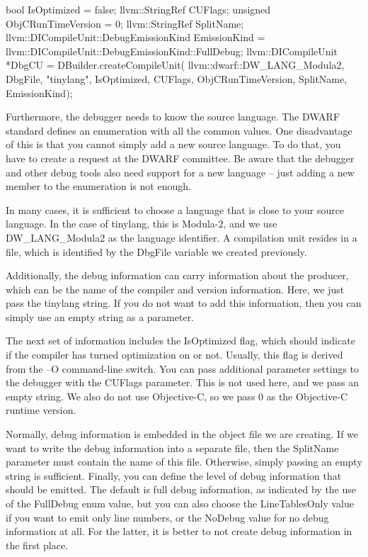 \begin{cpp}
bool IsOptimized = false;
llvm::StringRef CUFlags;
unsigned ObjCRunTimeVersion = 0;
llvm::StringRef SplitName;
llvm::DICompileUnit::DebugEmissionKind EmissionKind =
    llvm::DICompileUnit::DebugEmissionKind::FullDebug;
llvm::DICompileUnit *DbgCU = DBuilder.createCompileUnit(
    llvm::dwarf::DW_LANG_Modula2, DbgFile, "tinylang",
    IsOptimized, CUFlags, ObjCRunTimeVersion, SplitName,
    EmissionKind);
\end{cpp}

Furthermore, the debugger needs to know the source language. The DWARF standard defines an enumeration with all the common values. One disadvantage of this is that you cannot simply add a new source language. To do that, you have to create a request at the DWARF committee. Be aware that the debugger and other debug tools also need support for a new language – just adding a new member to the enumeration is not enough.

In many cases, it is sufficient to choose a language that is close to your source language. In the case of tinylang, this is Modula-2, and we use DW\_LANG\_Modula2 as the language identifier. A compilation unit resides in a file, which is identified by the DbgFile variable we created previously.

Additionally, the debug information can carry information about the producer, which can be the name of the compiler and version information. Here, we just pass the tinylang string. If you do not want to add this information, then you can simply use an empty string as a parameter.

The next set of information includes the IsOptimized flag, which should indicate if the compiler has turned optimization on or not. Usually, this flag is derived from the –O command-line switch.
You can pass additional parameter settings to the debugger with the CUFlags parameter. This is not used here, and we pass an empty string. We also do not use Objective-C, so we pass 0 as the Objective-C runtime version.

Normally, debug information is embedded in the object file we are creating. If we want to write the debug information into a separate file, then the SplitName parameter must contain the name of this file. Otherwise, simply passing an empty string is sufficient. Finally, you can define the level of debug information that should be emitted. The default is full debug information, as indicated by the use of the FullDebug enum value, but you can also choose the LineTablesOnly value if you want to emit only line numbers, or the NoDebug value for no debug information at all. For the latter, it is better to not create debug information in the first place.

